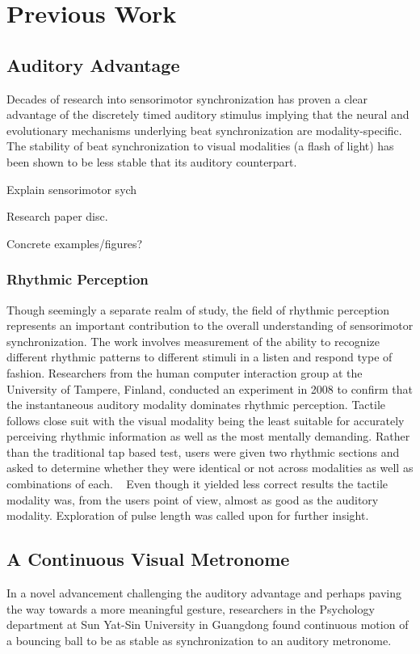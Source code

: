 \chapter{Previous Work}
\section{Auditory Advantage}
Decades of research into sensorimotor synchronization has proven a clear advantage of the discretely timed auditory stimulus implying that the neural and evolutionary mechanisms underlying beat synchronization are modality-specific. ~\cite{gan2015synchronization} The stability of beat synchronization to visual modalities (a flash of light) has been shown to be less stable that its auditory counterpart.

Explain sensorimotor sych

Research paper disc.

Concrete examples/figures?

\subsection{Rhythmic Perception}
Though seemingly a separate realm of study, the field of rhythmic perception represents an important contribution to the overall understanding of sensorimotor synchronization. The work involves measurement of the ability to recognize different rhythmic patterns to different stimuli in a listen and respond type of fashion. Researchers from the human computer interaction group at the University of Tampere, Finland, conducted an experiment in 2008 to confirm that the instantaneous auditory modality dominates rhythmic perception. Tactile follows close suit with the visual modality being the least suitable for accurately perceiving rhythmic information as well as the most mentally demanding. Rather than the traditional tap based test, users were given two rhythmic sections and asked to determine whether they were identical or not across modalities as well as combinations of each. ~\cite{jokiniemi2008crossmodal} Even though it yielded less correct results the tactile modality was, from the users point of view, almost as good as the auditory modality. Exploration of pulse length was called upon for further insight.

\section{A Continuous Visual Metronome}
In a novel advancement challenging the auditory advantage and perhaps paving the way towards a more meaningful gesture, researchers in the Psychology department at Sun Yat-Sin University in Guangdong found continuous motion of a bouncing ball to be as stable as synchronization to an auditory metronome.

